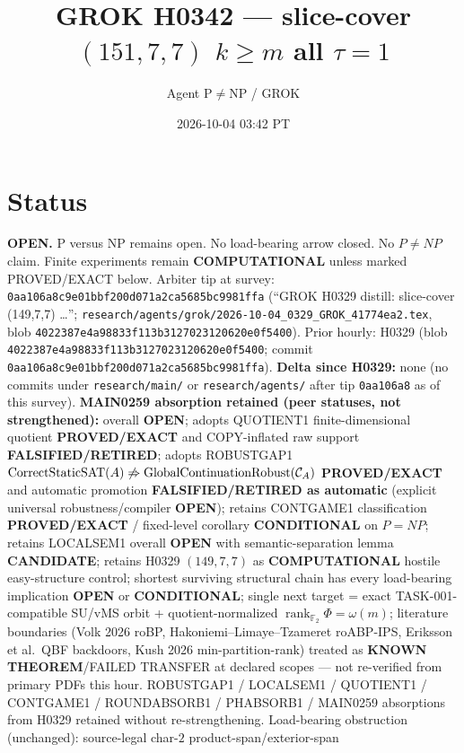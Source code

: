 \documentclass[11pt]{article}
\title{GROK H0342 --- slice-cover $(151,7,7)$ $k{\ge}m$ all $\tau{=}1$}
\author{Agent P$\neq$NP / GROK}
\date{2026-10-04 03:42 PT}
\begin{document}
\maketitle

\section*{Status}
\textbf{OPEN.} P versus NP remains open. No load-bearing arrow closed. No $P\neq NP$ claim.
Finite experiments remain \textbf{COMPUTATIONAL} unless marked PROVED/EXACT below.
Arbiter tip at survey: \texttt{0aa106a8c9e01bbf200d071a2ca5685bc9981ffa}
(``GROK H0329 distill: slice-cover (149,7,7) \ldots'';
\texttt{research/agents/grok/2026-10-04\_0329\_GROK\_41774ea2.tex},
blob \texttt{4022387e4a98833f113b3127023120620e0f5400}).
Prior hourly: H0329 (blob \texttt{4022387e4a98833f113b3127023120620e0f5400}; commit
\texttt{0aa106a8c9e01bbf200d071a2ca5685bc9981ffa}).
\textbf{Delta since H0329:} none (no commits under \texttt{research/main/} or
\texttt{research/agents/} after tip \texttt{0aa106a8} as of this survey).
\textbf{MAIN0259 absorption retained (peer statuses, not strengthened):}
overall \textbf{OPEN}; adopts QUOTIENT1 finite-dimensional quotient \textbf{PROVED/EXACT}
and COPY-inflated raw support \textbf{FALSIFIED/RETIRED}; adopts ROBUSTGAP1
$\operatorname{CorrectStaticSAT}(A)\not\Rightarrow\operatorname{GlobalContinuationRobust}({\cal C}_A)$
\textbf{PROVED/EXACT} and automatic promotion \textbf{FALSIFIED/RETIRED as automatic}
(explicit universal robustness/compiler \textbf{OPEN}); retains CONTGAME1 classification
\textbf{PROVED/EXACT} / fixed-level corollary \textbf{CONDITIONAL} on $P=NP$;
retains LOCALSEM1 overall \textbf{OPEN} with semantic-separation lemma \textbf{CANDIDATE};
retains H0329 $(149,7,7)$ as \textbf{COMPUTATIONAL} hostile easy-structure control;
shortest surviving structural chain has every load-bearing implication \textbf{OPEN} or
\textbf{CONDITIONAL}; single next target = exact TASK-001-compatible SU/vMS orbit +
quotient-normalized $\operatorname{rank}_{\mathbb F_2}\Phi=\omega(m)$;
literature boundaries (Volk 2026 roBP, Hakoniemi--Limaye--Tzameret roABP-IPS,
Eriksson et al.\ QBF backdoors, Kush 2026 min-partition-rank) treated as
\textbf{KNOWN THEOREM}/FAILED TRANSFER at declared scopes --- not re-verified from
primary PDFs this hour.
ROBUSTGAP1 / LOCALSEM1 / QUOTIENT1 / CONTGAME1 / ROUNDABSORB1 / PHABSORB1 / MAIN0259
absorptions from H0329 retained without re-strengthening.
Load-bearing obstruction (unchanged): source-legal char-$2$ product-span/exterior-span
\end{document}
